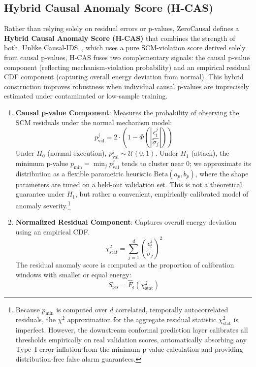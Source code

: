 \subsection{Hybrid Causal Anomaly Score (H-CAS)}
Rather than relying solely on residual errors or p-values, ZeroCausal defines a \textbf{Hybrid Causal Anomaly Score (H-CAS)} that combines the strength of both.
Unlike Causal-IDS~\cite{causalids2026}, which uses a pure SCM-violation score derived solely from causal p-values, H-CAS fuses two complementary signals: the causal p-value component (reflecting mechanism-violation probability) and an empirical residual CDF component (capturing overall energy deviation from normal). This hybrid construction improves robustness when individual causal p-values are imprecisely estimated under contaminated or low-sample training.
\begin{enumerate}
\item \textbf{Causal p-value Component}: Measures the probability of observing the SCM residuals under the normal mechanism model:
\begin{equation}
p_{\text{val}}^j = 2 \cdot \left(1 - \Phi\left(\left|\frac{\epsilon^j_t}{\tilde{\sigma}_j}\right|\right)\right)
\end{equation}
Under $H_0$ (normal execution), $p_{\text{val}}^j \sim \mathcal{U}(0,1)$. Under $H_1$ (attack), the minimum p-value $p_{\min} = \min_j p_{\text{val}}^j$ tends to cluster near 0; we approximate its distribution as a flexible parametric heuristic $\text{Beta}(a_p, b_p)$, where the shape parameters are tuned on a held-out validation set. This is not a theoretical guarantee under $H_1$, but rather a convenient, empirically calibrated model of anomaly severity.\footnote{Because $p_{\min}$ is computed over $d$ correlated, temporally autocorrelated residuals, the $\chi^2$ approximation for the aggregate residual statistic $\chi^2_{\text{stat}}$ is imperfect. However, the downstream conformal prediction layer calibrates all thresholds empirically on real validation scores, automatically absorbing any Type~I error inflation from the minimum p-value calculation and providing distribution-free false alarm guarantees.}
\item \textbf{Normalized Residual Component}: Captures overall energy deviation using an empirical CDF.
\begin{equation}
\chi^2_{\text{stat}} = \sum_{j=1}^d \left(\frac{\epsilon^j_t}{\tilde{\sigma}_j}\right)^2
\end{equation}
The residual anomaly score is computed as the proportion of calibration windows with smaller or equal energy:
\begin{equation}
S_{\text{res}} = \hat{F}_{\epsilon}(\chi^2_{\text{stat}})
\end{equation}
\end{enumerate}

